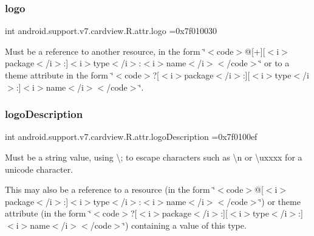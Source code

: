 \subsubsection{\texorpdfstring{logo}{logo}}
{\footnotesize\ttfamily int android.\+support.\+v7.\+cardview.\+R.\+attr.\+logo =0x7f010030\hspace{0.3cm}{\ttfamily [static]}}

Must be a reference to another resource, in the form \char`\"{}$<$code$>$@\mbox{[}+\mbox{]}\mbox{[}$<$i$>$package$<$/i$>$\+:\mbox{]}$<$i$>$type$<$/i$>$\+:$<$i$>$name$<$/i$>$$<$/code$>$\char`\"{} or to a theme attribute in the form \char`\"{}$<$code$>$?\mbox{[}$<$i$>$package$<$/i$>$\+:\mbox{]}\mbox{[}$<$i$>$type$<$/i$>$\+:\mbox{]}$<$i$>$name$<$/i$>$$<$/code$>$\char`\"{}. \mbox{\label{classandroid_1_1support_1_1v7_1_1cardview_1_1R_1_1attr_ad3e2f083139412eba5cf3a9f92922ef3}} 
\subsubsection{\texorpdfstring{logo\+Description}{logoDescription}}
{\footnotesize\ttfamily int android.\+support.\+v7.\+cardview.\+R.\+attr.\+logo\+Description =0x7f0100ef\hspace{0.3cm}{\ttfamily [static]}}

Must be a string value, using \textquotesingle{}\textbackslash{};\textquotesingle{} to escape characters such as \textquotesingle{}\textbackslash{}n\textquotesingle{} or \textquotesingle{}\textbackslash{}uxxxx\textquotesingle{} for a unicode character. 

This may also be a reference to a resource (in the form \char`\"{}$<$code$>$@\mbox{[}$<$i$>$package$<$/i$>$\+:\mbox{]}$<$i$>$type$<$/i$>$\+:$<$i$>$name$<$/i$>$$<$/code$>$\char`\"{}) or theme attribute (in the form \char`\"{}$<$code$>$?\mbox{[}$<$i$>$package$<$/i$>$\+:\mbox{]}\mbox{[}$<$i$>$type$<$/i$>$\+:\mbox{]}$<$i$>$name$<$/i$>$$<$/code$>$\char`\"{}) containing a value of this type. \mbox{\label{classandroid_1_1support_1_1v7_1_1cardview_1_1R_1_1attr_a23452c6aa2d34fcffde5be3a48f5723e}} 
